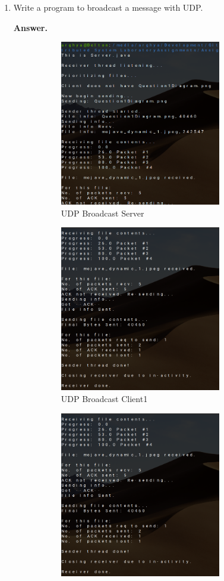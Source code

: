 \documentclass{article}
\begin{document}
\begin{enumerate}
\pagebreak

\item Write a program to broadcast a message with UDP.
\begin{flushleft}
\textbf{Answer.}
\end{flushleft}


\pagebreak

\pagebreak

\pagebreak

\begin{figure}
\begin{subfigure}{.3\textwidth}
\includegraphics[width=200pt]{Output3}
\caption{UDP Broadcast Server}
\label{UDPBroadcastServer}
\end{subfigure}
\begin{subfigure}{.3\textwidth}
\includegraphics[width=200pt]{Output4}
\caption{UDP Broadcast Client1}
\label{UDPBroadcastClient1}
\end{subfigure}
\begin{subfigure}{.3\textwidth}
\includegraphics[width=200pt]{Output4}

\end{subfigure}
\end{figure}
\end{enumerate}
\end{document}

